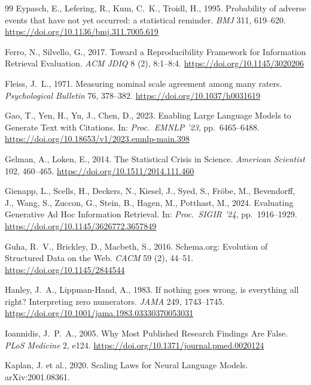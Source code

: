 \documentclass[preprint,12pt,authoryear]{elsarticle}
\begin{document}
\begin{thebibliography}{99}
Eypasch, E., Lefering, R., Kum, C.~K., Troidl, H., 1995. Probability of adverse events that have not yet occurred: a statistical reminder. \textit{BMJ} 311, 619--620. \url{https://doi.org/10.1136/bmj.311.7005.619}

Ferro, N., Silvello, G., 2017. Toward a Reproducibility Framework for Information Retrieval Evaluation. \textit{ACM JDIQ} 8 (2), 8:1--8:4. \url{https://doi.org/10.1145/3020206}

Fleiss, J.~L., 1971. Measuring nominal scale agreement among many raters. \textit{Psychological Bulletin} 76, 378--382. \url{https://doi.org/10.1037/h0031619}

Gao, T., Yen, H., Yu, J., Chen, D., 2023. Enabling Large Language Models to Generate Text with Citations. In: \textit{Proc.\ EMNLP '23}, pp.~6465--6488. \url{https://doi.org/10.18653/v1/2023.emnlp-main.398}

Gelman, A., Loken, E., 2014. The Statistical Crisis in Science. \textit{American Scientist} 102, 460--465. \url{https://doi.org/10.1511/2014.111.460}

Gienapp, L., Scells, H., Deckers, N., Kiesel, J., Syed, S., Fr\"obe, M., Bevendorff, J., Wang, S., Zuccon, G., Stein, B., Hagen, M., Potthast, M., 2024. Evaluating Generative Ad Hoc Information Retrieval. In: \textit{Proc.\ SIGIR '24}, pp.~1916--1929. \url{https://doi.org/10.1145/3626772.3657849}

Guha, R.~V., Brickley, D., Macbeth, S., 2016. Schema.org: Evolution of Structured Data on the Web. \textit{CACM} 59 (2), 44--51. \url{https://doi.org/10.1145/2844544}

Hanley, J.~A., Lippman-Hand, A., 1983. If nothing goes wrong, is everything all right? Interpreting zero numerators. \textit{JAMA} 249, 1743--1745. \url{https://doi.org/10.1001/jama.1983.03330370053031}

Ioannidis, J.~P.~A., 2005. Why Most Published Research Findings Are False. \textit{PLoS Medicine} 2, e124. \url{https://doi.org/10.1371/journal.pmed.0020124}

Kaplan, J. et al., 2020. Scaling Laws for Neural Language Models. arXiv:2001.08361.


\end{thebibliography}
\end{document}
